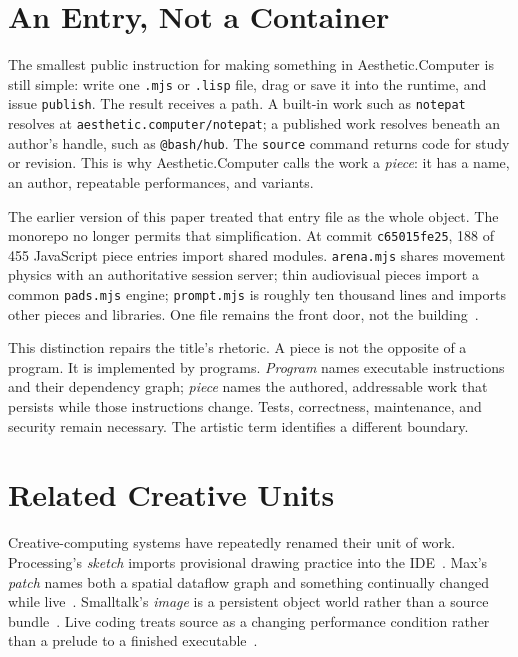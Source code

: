 \documentclass[10pt,letterpaper,twocolumn]{article}
\newcommand{\acdot}{{\color{acpink}.}}
\newcommand{\ac}{Aesthetic{\acdot}Computer}
\newcommand{\code}[1]{\texttt{#1}}
\begin{document}
\section{An Entry, Not a Container}

The smallest public instruction for making something in \ac{} is still simple: write one \code{.mjs} or \code{.lisp} file, drag or save it into the runtime, and issue \code{publish}. The result receives a path. A built-in work such as \code{notepat} resolves at \code{aesthetic.computer/notepat}; a published work resolves beneath an author's handle, such as \code{@bash/hub}. The \code{source} command returns code for study or revision. This is why \ac{} calls the work a \emph{piece}: it has a name, an author, repeatable performances, and variants.

The earlier version of this paper treated that entry file as the whole object. The monorepo no longer permits that simplification. At commit \code{c65015fe25}, 188 of 455 JavaScript piece entries import shared modules. \code{arena.mjs} shares movement physics with an authoritative session server; thin audiovisual pieces import a common \code{pads.mjs} engine; \code{prompt.mjs} is roughly ten thousand lines and imports other pieces and libraries. One file remains the front door, not the building~\citep{acrepo2026}.

This distinction repairs the title's rhetoric. A piece is not the opposite of a program. It is implemented by programs. \emph{Program} names executable instructions and their dependency graph; \emph{piece} names the authored, addressable work that persists while those instructions change. Tests, correctness, maintenance, and security remain necessary. The artistic term identifies a different boundary.

\section{Related Creative Units}

Creative-computing systems have repeatedly renamed their unit of work. Processing's \emph{sketch} imports provisional drawing practice into the IDE~\citep{reas2007processing}. Max's \emph{patch} names both a spatial dataflow graph and something continually changed while live~\citep{puckette1988patcher,puckette1996pure}. Smalltalk's \emph{image} is a persistent object world rather than a source bundle~\citep{kay1977personal}. Live coding treats source as a changing performance condition rather than a prelude to a finished executable~\citep{blackwell2022livecoding}.
\end{document}
